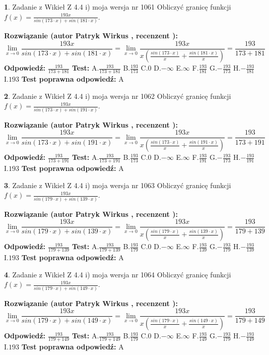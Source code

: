 \documentclass[12pt, a4paper]{article}
\theoremstyle{definition} %
\newtheorem{zad}{}
\newcommand{\zadStart}[1]{\begin{zad}#1\newline}
\newcommand{\zadStop}{\end{zad}}
\newcommand{\rozwStart}[2]{\noindent \textbf{Rozwiązanie (autor #1 , recenzent #2): }\newline}
\newcommand{\rozwStop}{\newline}
\newcommand{\odpStart}{\noindent \textbf{Odpowiedź:}\newline}
\newcommand{\odpStop}{\newline}
\newcommand{\testStart}{\noindent \textbf{Test:}\newline}
\newcommand{\testStop}{\newline}
\newcommand{\kluczStart}{\noindent \textbf{Test poprawna odpowiedź:}\newline}
\newcommand{\kluczStop}{\newline}
\begin{document}
\zadStart{Zadanie z Wikieł Z 4.4 i) moja wersja nr 1061}
Obliczyć granicę funkcji $f(x)=\frac{193x}{sin(173\cdot x) +sin(181\cdot x)}$.
\zadStop
\rozwStart{Patryk Wirkus}{}
$$\lim\limits_{x\to 0}\frac{193x}{sin(173\cdot x) +sin(181\cdot x)}=\lim\limits_{x\to 0}\frac{193x}{x(\frac{sin(173\cdot x)}{x}+\frac{sin(181\cdot x)}{x})}=\frac{193}{173+181}$$
\rozwStop
\odpStart
$\frac{193}{173+181}$
\odpStop
\testStart
A.$\frac{193}{173+181}$
B.$\frac{193}{173}$
C.$0$
D.$-\infty$
E.$\infty$
F.$\frac{193}{181}$
G.$-\frac{193}{173}$
H.$-\frac{193}{181}$
I.$193$
\testStop
\kluczStart
A
\kluczStop



\zadStart{Zadanie z Wikieł Z 4.4 i) moja wersja nr 1062}
Obliczyć granicę funkcji $f(x)=\frac{193x}{sin(173\cdot x) +sin(191\cdot x)}$.
\zadStop
\rozwStart{Patryk Wirkus}{}
$$\lim\limits_{x\to 0}\frac{193x}{sin(173\cdot x) +sin(191\cdot x)}=\lim\limits_{x\to 0}\frac{193x}{x(\frac{sin(173\cdot x)}{x}+\frac{sin(191\cdot x)}{x})}=\frac{193}{173+191}$$
\rozwStop
\odpStart
$\frac{193}{173+191}$
\odpStop
\testStart
A.$\frac{193}{173+191}$
B.$\frac{193}{173}$
C.$0$
D.$-\infty$
E.$\infty$
F.$\frac{193}{191}$
G.$-\frac{193}{173}$
H.$-\frac{193}{191}$
I.$193$
\testStop
\kluczStart
A
\kluczStop



\zadStart{Zadanie z Wikieł Z 4.4 i) moja wersja nr 1063}
Obliczyć granicę funkcji $f(x)=\frac{193x}{sin(179\cdot x) +sin(139\cdot x)}$.
\zadStop
\rozwStart{Patryk Wirkus}{}
$$\lim\limits_{x\to 0}\frac{193x}{sin(179\cdot x) +sin(139\cdot x)}=\lim\limits_{x\to 0}\frac{193x}{x(\frac{sin(179\cdot x)}{x}+\frac{sin(139\cdot x)}{x})}=\frac{193}{179+139}$$
\rozwStop
\odpStart
$\frac{193}{179+139}$
\odpStop
\testStart
A.$\frac{193}{179+139}$
B.$\frac{193}{179}$
C.$0$
D.$-\infty$
E.$\infty$
F.$\frac{193}{139}$
G.$-\frac{193}{179}$
H.$-\frac{193}{139}$
I.$193$
\testStop
\kluczStart
A
\kluczStop



\zadStart{Zadanie z Wikieł Z 4.4 i) moja wersja nr 1064}
Obliczyć granicę funkcji $f(x)=\frac{193x}{sin(179\cdot x) +sin(149\cdot x)}$.
\zadStop
\rozwStart{Patryk Wirkus}{}
$$\lim\limits_{x\to 0}\frac{193x}{sin(179\cdot x) +sin(149\cdot x)}=\lim\limits_{x\to 0}\frac{193x}{x(\frac{sin(179\cdot x)}{x}+\frac{sin(149\cdot x)}{x})}=\frac{193}{179+149}$$
\rozwStop
\odpStart
$\frac{193}{179+149}$
\odpStop
\testStart
A.$\frac{193}{179+149}$
B.$\frac{193}{179}$
C.$0$
D.$-\infty$
E.$\infty$
F.$\frac{193}{149}$
G.$-\frac{193}{179}$
H.$-\frac{193}{149}$
I.$193$
\testStop
\kluczStart
A
\kluczStop
\end{document}
